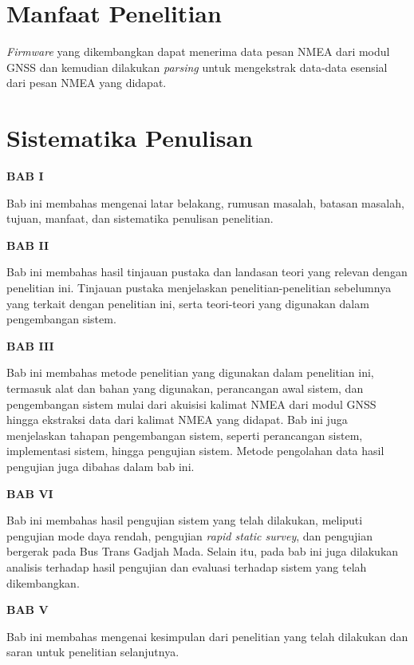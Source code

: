 \section{Manfaat Penelitian}
\textit{Firmware} yang dikembangkan dapat menerima data pesan NMEA dari modul GNSS dan kemudian dilakukan \textit{parsing} untuk mengekstrak data-data esensial dari pesan NMEA yang didapat.

\section{Sistematika Penulisan}
\textbf{BAB I}

Bab ini membahas mengenai latar belakang, rumusan masalah, batasan masalah, tujuan, manfaat, dan sistematika penulisan penelitian.

\textbf{BAB II}

Bab ini membahas hasil tinjauan pustaka dan landasan teori yang relevan dengan penelitian ini. Tinjauan pustaka menjelaskan penelitian-penelitian sebelumnya yang terkait dengan penelitian ini, serta teori-teori yang digunakan dalam pengembangan sistem.

\textbf{BAB III}

Bab ini membahas metode penelitian yang digunakan dalam penelitian ini, termasuk alat dan bahan yang digunakan, perancangan awal sistem, dan pengembangan sistem mulai dari akuisisi kalimat NMEA dari modul GNSS hingga ekstraksi data dari kalimat NMEA yang didapat. Bab ini juga menjelaskan tahapan pengembangan sistem, seperti perancangan sistem, implementasi sistem, hingga pengujian sistem. Metode pengolahan data hasil pengujian juga dibahas dalam bab ini.  

\textbf{BAB VI}

Bab ini membahas hasil pengujian sistem yang telah dilakukan, meliputi pengujian mode daya rendah, pengujian \textit{rapid static survey}, dan pengujian bergerak pada Bus Trans Gadjah Mada. Selain itu, pada bab ini juga dilakukan analisis terhadap hasil pengujian dan evaluasi terhadap sistem yang telah dikembangkan.

\newpage
\textbf{BAB V}

Bab ini membahas mengenai kesimpulan dari penelitian yang telah dilakukan dan saran untuk penelitian selanjutnya.